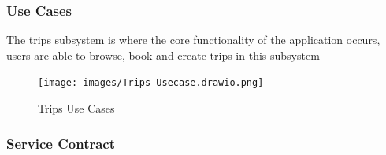 \documentclass[hidelinks, 12pt, a4paper]{article}
\begin{document}
\subsubsection{Use Cases}
The trips subsystem is where the core functionality of the application occurs, users are able to browse, book and create trips in this subsystem

\begin{figure}[H]

      \centering
      \texttt{[image: images/Trips Usecase.drawio.png]}
      \caption{Trips Use Cases}
      \label{fig:User UseCases}

\end{figure}
\newpage
\subsubsection{Service Contract}
\end{document}
